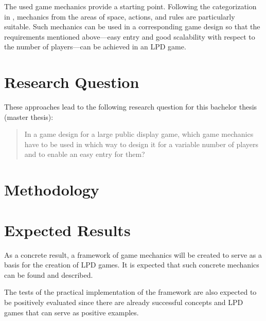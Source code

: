 The used game mechanics provide a starting point. Following the categorization
in \cite{Schell2019}, mechanics from the areas of space, actions, and rules are
particularly suitable. Such mechanics can be used in a corresponding game design
so that the requirements mentioned above---easy entry and good scalability with
respect to the number of players---can be achieved in an LPD game.


\section{Research Question}

These approaches lead to the following research question for this bachelor
thesis (master thesis):
%
\begin{quote}
	In a game design for a large public display game, which game mechanics have
	to be used in which way to design it for a variable number of players and to
	enable an easy entry for them?
\end{quote}


\section{Methodology}

\iffalse
To answer this question, the bachelor thesis (master thesis) will be realized
as a combination of literature work and practical or prototypical
implementation.

First, the existing literature (extending section \ref{sec:state-of-the-art})
will show how the topic of smooth transition gameplay is dealt with from a
game design perspective. Common factors such as mechanics will be extracted
from this and serve as the basis for a theoretical framework. This framework
will contain a list of core mechanics and guidelines for their application so
that LPD games allow easy entry and a variable number of players.

The applicability of this framework will be tested by an own LPD game developed
during the term project. By asking simple qualitative questions to the players
and observing the visitors during several test runs, it will be determined
whether smooth transition gameplay could be achieved with the mechanics used.
\fi

\section{Expected Results}

As a concrete result, a framework of game mechanics will be created to serve as
a basis for the creation of LPD games. It is expected that such concrete
mechanics can be found and described.

The tests of the practical implementation of the framework are also expected to
be positively evaluated since there are already successful concepts and LPD
games that can serve as positive examples.
